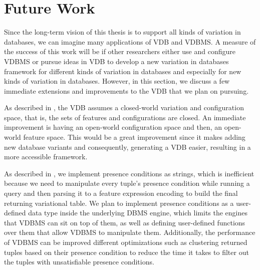 \section{Future Work}
\label{sec:fw}

Since the long-term vision of this thesis is to support all kinds of variation
in databases, we can imagine many applications of VDB and VDBMS. A
measure of the success of this work will be if other researchers either use 
and configure VDBMS or pursue ideas in VDB to develop a new variation 
in databases framework  for different kinds of variation
in databases and especially for new kinds of variation in databases. 
%
However, in this section, we discuss a few immediate extensions and
improvements to the VDB that we plan on pursuing.

As described in , the VDB assumes a 
closed-world variation and configuration space, that is, the sets of features 
and configurations are closed. An immediate improvement is having an
open-world configuration space and then, an open-world feature space.
This would be a great improvement since it makes adding new database
variants and consequently, generating a VDB easier, resulting in a 
more accessible framework.

%
%
As described in , we implement presence conditions as strings, which is
inefficient because we need to manipulate every tuple's 
presence condition while running a 
query and then parsing it to a feature expression encoding to build the final
returning variational table. We plan to implement presence conditions as a 
user-defined data type inside the underlying DBMS engine, which
limits the engines that VDBMS can sit on top of them, as well as
defining user-defined functions over them that allow VDBMS to
manipulate them. 
%
Additionally, the performance of VDBMS can be improved different optimizations
such as clustering returned tuples based on their presence condition to reduce the
time it takes to filter out the tuples with unsatisfiable presence conditions. 

